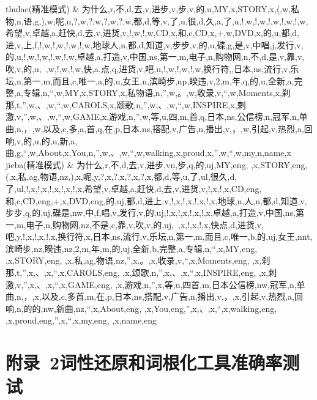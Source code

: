 \begin{center}
\begin{longtabu}
thulac\newline (精准模式) & 为什么,r,不,d,去,v,进步,v,步,v,的,u,MY,x,STORY,x,(,w,私物,n,语,g,),w,呢,u,?,w,?,w,?,w,?,w,都,d,等,v,了,u,很,d,久,a,了,u,!,w,!,w,!,w,!,w,!,w,希望,v,卓越,a,赶快,d,去,v,进货,v,!,w,!,w,CD,x,和,c,CD,x,+,w,DVD,x,的,u,都,d,进,v,上,f,!,w,!,w,!,w,!,w,地球人,n,都,d,知道,v,步步,v,的,u,碟,g,是,v,中唱,j,发行,v,的,u,!,w,!,w,!,w,!,w,卓越,a,打造,v,中国,ns,第一,m,电子,n,购物网,n,不,d,是,v,靠,v,吹,v,的,u,~,w,!,w,!,w,快,a,点,q,进货,v,吧,u,!,w,!,w,!,w,换行符,,日本,ns,流行,v,乐坛,n,第一,m,而且,c,唯一,a,的,u,女王,n,滨崎步,np,睽违,v,2,m,年,q,的,u,全新,a,完整,a,专辑,n,“,w,MY,x,STORY,x,私物语,n,”,w,。,w,收录,v,“,w,Moments,x,刹那,t,”,w,、,w,“,w,CAROLS,x,颂歌,n,”,w,、,w,“,w,INSPIRE,x,刺激,v,”,w,、,w,“,w,GAME,x,游戏,n,”,w,等,u,四,m,首,q,日本,ns,公信榜,n,冠军,n,单曲,n,，,w,以及,c,多,a,首,q,在,p,日本,ns,搭配,v,广告,n,播出,v,，,w,引起,v,热烈,a,回响,v,的,u,的,u,新,a,曲,g,“,w,About,x,You,n,”,w,、,w,“,w,walking,x,proud,x,”,w,“,w,my,n,name,x\\
jieba\newline (精准模式) & 为什么,r,不,d,去,v,进步,vn,步,q,的,uj,MY,eng, ,x,STORY,eng,(,x,私,ag,物语,nz,),x,呢,y,?,x,?,x,?,x,?,x,都,d,等,u,了,ul,很久,d,了,ul,!,x,!,x,!,x,!,x,!,x,希望,v,卓越,a,赶快,d,去,v,进货,v,!,x,!,x,CD,eng,和,c,CD,eng,+,x,DVD,eng,的,uj,都,d,进上,v,!,x,!,x,!,x,!,x,地球,n,人,n,都,d,知道,v,步步,q,的,uj,碟是,nw,中,f,唱,v,发行,v,的,uj,!,x,!,x,!,x,!,x,卓越,a,打造,v,中国,ns,第一,m,电子,n,购物网,nz,不是,c,靠,v,吹,v,的,uj,~,x,!,x,!,x,快点,d,进货,v,吧,y,!,x,!,x,!,x,换行符,x,日本,ns,流行,v,乐坛,n,第一,m,而且,c,唯一,b,的,uj,女王,nnt,滨崎步,nz,睽违,nz,2,m,年,m,的,uj,全新,b,完整,a,专辑,n,“,x,MY,eng, ,x,STORY,eng, ,x,私,ag,物语,nz,”,x,。,x,收录,v,“,x,Moments,eng, ,x,刹那,t,”,x,、,x,“,x,CAROLS,eng, ,x,颂歌,n,”,x,、,x,“,x,INSPIRE,eng, ,x,刺激,v,”,x,、,x,“,x,GAME,eng, ,x,游戏,n,”,x,等,u,四首,m,日本公信榜,nw,冠军,n,单曲,n,，,x,以及,c,多首,m,在,p,日本,ns,搭配,v,广告,n,播出,v,，,x,引起,v,热烈,a,回响,n,的的,nw,新曲,nz,“,x,About,eng, ,x,You,eng,”,x,、,x,“,x,walking,eng, ,x,proud,eng,”,x,“,x,my,eng, ,x,name,eng\\
\hline
\end{longtabu}
\end{center}
\section*{附录~2\quad	词性还原和词根化工具准确率测试 \label{appendix:lemmacompare}}

